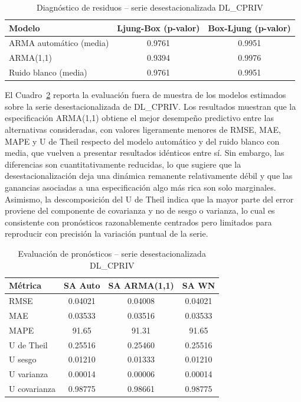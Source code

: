 \documentclass[11pt]{article}
\begin{document}
\begin{table}[H]
\centering
\caption{Diagnóstico de residuos – serie desestacionalizada DL\_CPRIV}
\label{tab:diag_sa_cpriv}
\begin{tabular}{lcc}
\hline
Modelo & Ljung-Box (p-valor) & Box-Ljung (p-valor) \\
\hline
ARMA automático (media) & 0.9761 & 0.9951 \\
ARMA(1,1)              & 0.9394 & 0.9976 \\
Ruido blanco (media)   & 0.9761 & 0.9951 \\
\hline
\end{tabular}
\end{table}

El Cuadro~\ref{tab:forecast_sa_cpriv} reporta la evaluación fuera de muestra de los modelos estimados sobre la serie desestacionalizada de DL\_CPRIV. Los resultados muestran que la especificación ARMA(1,1) obtiene el mejor desempeño predictivo entre las alternativas consideradas, con valores ligeramente menores de RMSE, MAE, MAPE y U de Theil respecto del modelo automático y del ruido blanco con media, que vuelven a presentar resultados idénticos entre sí. Sin embargo, las diferencias son cuantitativamente reducidas, lo que sugiere que la desestacionalización deja una dinámica remanente relativamente débil y que las ganancias asociadas a una especificación algo más rica son solo marginales. Asimismo, la descomposición del U de Theil indica que la mayor parte del error proviene del componente de covarianza y no de sesgo o varianza, lo cual es consistente con pronósticos razonablemente centrados pero limitados para reproducir con precisión la variación puntual de la serie.

\begin{table}[H]
\centering
\caption{Evaluación de pronósticos – serie desestacionalizada DL\_CPRIV}
\label{tab:forecast_sa_cpriv}
\begin{tabular}{lccc}
\hline
Métrica & SA Auto & SA ARMA(1,1) & SA WN \\
\hline
RMSE         & 0.04021 & 0.04008 & 0.04021 \\
MAE          & 0.03533 & 0.03516 & 0.03533 \\
MAPE         & 91.65   & 91.31   & 91.65   \\
U de Theil   & 0.25516 & 0.25460 & 0.25516 \\
U sesgo      & 0.01210 & 0.01333 & 0.01210 \\
U varianza   & 0.00014 & 0.00006 & 0.00014 \\
U covarianza & 0.98775 & 0.98661 & 0.98775 \\
\hline
\end{tabular}
\end{table}
\end{document}
